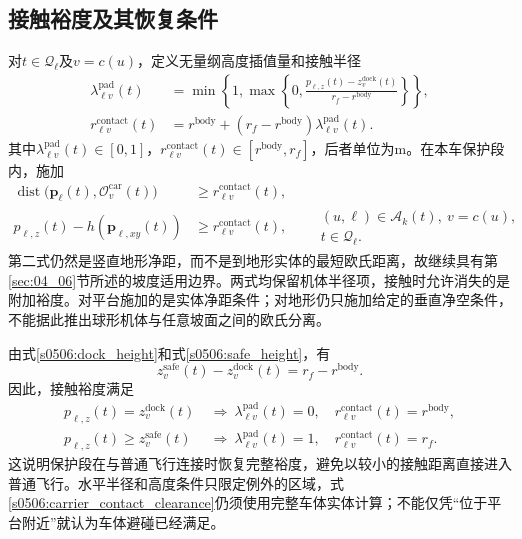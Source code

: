 \subsection{接触裕度及其恢复条件}

对$t\in\mathcal Q_\ell$及$v=c(u)$，定义无量纲高度插值量和接触半径
\begin{align}
 \lambda_{\ell v}^{\mathrm{pad}}(t)
 &=\min\left\{1,\max\left\{0,
 \frac{p_{\ell,z}(t)-z_v^{\mathrm{dock}}(t)}
      {r_f-r^{\mathrm{body}}}\right\}\right\},
 \label{s0506:pad_interpolation}\\
 r_{\ell v}^{\mathrm{contact}}(t)
 &=r^{\mathrm{body}}+
   (r_f-r^{\mathrm{body}})\lambda_{\ell v}^{\mathrm{pad}}(t).
 \label{s0506:contact_radius}
\end{align}
其中$\lambda_{\ell v}^{\mathrm{pad}}(t)\in[0,1]$，$r_{\ell v}^{\mathrm{contact}}(t)\in[r^{\mathrm{body}},r_f]$，后者单位为$\mathrm m$。在本车保护段内，施加
\begin{align}
 \operatorname{dist}\bigl(\mathbf p_\ell(t),
                   \mathcal O_v^{\mathrm{car}}(t)\bigr)
 &\ge r_{\ell v}^{\mathrm{contact}}(t),
 \label{s0506:carrier_contact_clearance}\\
 p_{\ell,z}(t)-h(\mathbf p_{\ell,xy}(t))
 &\ge r_{\ell v}^{\mathrm{contact}}(t),
 \qquad
 \substack{(u,\ell)\in\mathcal A_k(t),\ v=c(u),\\t\in\mathcal Q_\ell.}
 \label{s0506:terrain_contact_clearance}
\end{align}
第二式仍然是竖直地形净距，而不是到地形实体的最短欧氏距离，故继续具有第\ref{sec:04_06}节所述的坡度适用边界。两式均保留机体半径项，接触时允许消失的是附加裕度。对平台施加的是实体净距条件；对地形仍只施加给定的垂直净空条件，不能据此推出球形机体与任意坡面之间的欧氏分离。

由式\eqref{s0506:dock_height}和式\eqref{s0506:safe_height}，有
\begin{equation}
 z_v^{\mathrm{safe}}(t)-z_v^{\mathrm{dock}}(t)
 =r_f-r^{\mathrm{body}}.
 \label{s0506:transition_height_difference}
\end{equation}
因此，接触裕度满足
\begin{align}
 p_{\ell,z}(t)=z_v^{\mathrm{dock}}(t)
 &\ \Longrightarrow\ 
 \lambda_{\ell v}^{\mathrm{pad}}(t)=0,\quad
 r_{\ell v}^{\mathrm{contact}}(t)=r^{\mathrm{body}},
 \label{s0506:contact_limit}\\
 p_{\ell,z}(t)\ge z_v^{\mathrm{safe}}(t)
 &\ \Longrightarrow\ 
 \lambda_{\ell v}^{\mathrm{pad}}(t)=1,\quad
 r_{\ell v}^{\mathrm{contact}}(t)=r_f.
 \label{s0506:regular_limit}
\end{align}
这说明保护段在与普通飞行连接时恢复完整裕度，避免以较小的接触距离直接进入普通飞行。水平半径和高度条件只限定例外的区域，式\eqref{s0506:carrier_contact_clearance}仍须使用完整车体实体计算；不能仅凭“位于平台附近”就认为车体避碰已经满足。

